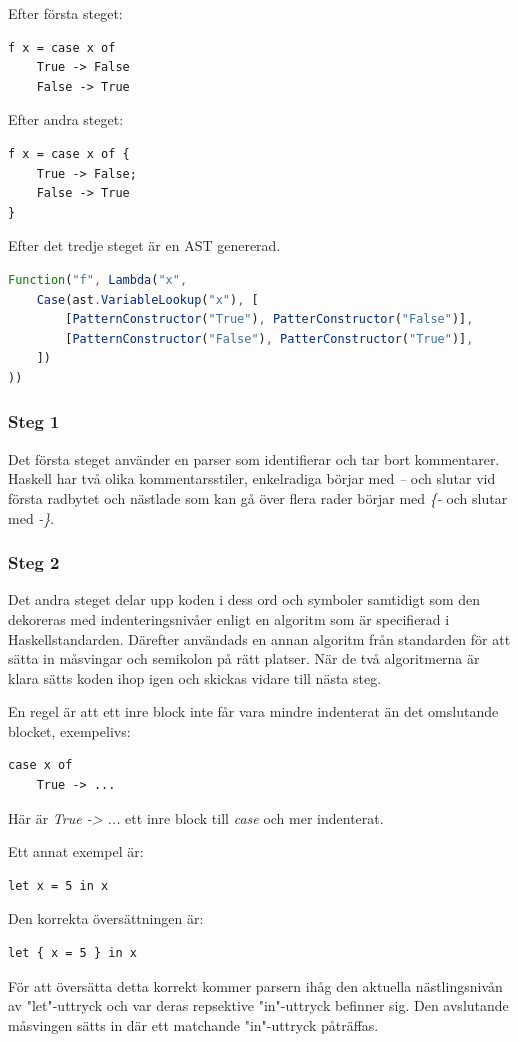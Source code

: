 Efter första steget:
\begin{lstlisting}
f x = case x of
    True -> False
    False -> True
\end{lstlisting}

Efter andra steget:
\begin{lstlisting}
f x = case x of {
    True -> False;
    False -> True
}
\end{lstlisting}

Efter det tredje steget är en AST genererad.
\begin{lstlisting}[language=javascript]
Function("f", Lambda("x", 
    Case(ast.VariableLookup("x"), [
        [PatternConstructor("True"), PatterConstructor("False")],
        [PatternConstructor("False"), PatterConstructor("True")],
    ])
))
\end{lstlisting}

\subsubsection{Steg 1}
Det första steget använder en parser som identifierar och tar bort kommentarer. 
Haskell har två olika kommentarsstiler, enkelradiga börjar med \emph{--} och slutar vid första radbytet och 
nästlade som kan gå över flera rader börjar med \emph{\{-} och slutar med \emph{-\}}.

\subsubsection{Steg 2}
Det andra steget delar upp koden i dess ord och symboler samtidigt som den dekoreras med indenteringsnivåer enligt en algoritm 
som är specifierad i Haskellstandarden. Därefter användads en annan algoritm från standarden för att sätta in måsvingar och semikolon på rätt platser. 
När de två algoritmerna är klara sätts koden ihop igen och skickas vidare till nästa steg.

En regel är att ett inre block inte får vara mindre indenterat än det omslutande blocket, exempelivs:
\begin{lstlisting}
case x of
    True -> ...
\end{lstlisting}
Här är \emph{True -> ...} ett inre block till \emph{case} och mer indenterat.

Ett annat exempel är:
\begin{lstlisting}
let x = 5 in x
\end{lstlisting}
Den korrekta översättningen är:
\begin{lstlisting}
let { x = 5 } in x
\end{lstlisting}
För att översätta detta korrekt kommer parsern ihåg den aktuella nästlingsnivån av "let"-uttryck och var deras repsektive "in"-uttryck befinner sig. 
Den avslutande måsvingen sätts in där ett matchande "in"-uttryck påträffas.

